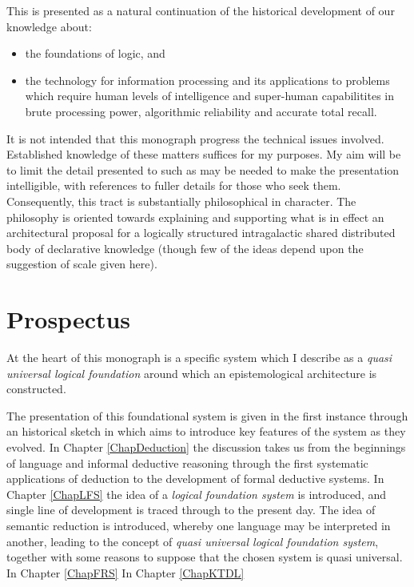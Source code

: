 \documentclass[10pt,titlepage]{book}
\begin{document}
This is presented as a natural continuation of the historical development of our knowledge about:
\begin{itemize}
\item the foundations of logic, and
\item the technology for information processing and its applications to problems which require human levels of intelligence and super-human capabilitites in brute processing power, algorithmic reliability and accurate total recall.
\end{itemize}

It is not intended that this monograph progress the technical issues involved.
Established knowledge of these matters suffices for my purposes.
My aim will be to limit the detail presented to such as may be needed to make the presentation intelligible, with references to fuller details for those who seek them.
Consequently, this tract is substantially philosophical in character.
The philosophy is oriented towards explaining and supporting what is in effect an architectural proposal for a  logically structured intragalactic shared distributed body of declarative knowledge (though few of the ideas depend upon the suggestion of scale given here).

\section{Prospectus}

At the heart of this monograph is a specific system which I describe as a \emph{quasi universal logical foundation} around which an epistemological architecture is constructed.

The presentation of this foundational system is given in the first instance through an historical sketch in which aims to introduce key features of the system as they evolved.
In Chapter \ref{ChapDeduction} the discussion takes us from the beginnings of language and informal deductive reasoning through the first systematic applications of deduction to the development of formal deductive systems.
In Chapter \ref{ChapLFS} the idea of a \emph{logical foundation system} is introduced, and single line of development is traced through to the present day.
The idea of semantic reduction is introduced, whereby one language may be interpreted in another, leading to the concept of \emph{quasi universal logical foundation system}, together with some reasons to suppose that the chosen system is quasi universal.
In Chapter \ref{ChapFRS}
In Chapter \ref{ChapKTDL}
\end{document}
